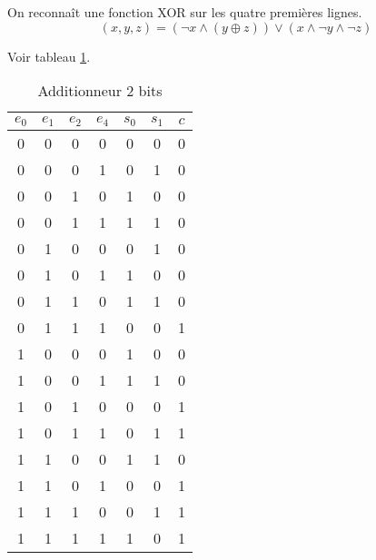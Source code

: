 \documentclass[a4paper,11pt]{article}
\begin{document}
\begin{Form}
\begin{exo}
On reconnaît une fonction XOR sur les quatre premières lignes.
$$(x,y,z)=(\lnot x \land (y \oplus z)) \lor (x \land \lnot y \land \lnot z)$$
\end{exo}
\begin{exo} Voir tableau \ref{addi}.
\begin{table}[!h]
\begin{center}
\begin{tabular}{|*4{c|}|*3{c|}}
\hline 
$e_0$ & $e_1$ & $e_2$ & $e_4$ & $s_0$ & $s_1$ & $c$ \\ 
\hline 
0 & 0 & 0 & 0 & 0 & 0 & 0 \\ 
\hline 
0 & 0 & 0 & 1 & 0 & 1 & 0 \\ 
\hline
0 & 0 & 1 & 0 & 1 & 0 & 0 \\ 
\hline
0 & 0 & 1 & 1 & 1 & 1 & 0 \\ 
\hline
0 & 1 & 0 & 0 & 0 & 1 & 0 \\ 
\hline
0 & 1 & 0 & 1 & 1 & 0 & 0 \\ 
\hline
0 & 1 & 1 & 0 & 1 & 1 & 0 \\ 
\hline
0 & 1 & 1 & 1 & 0 & 0 & 1 \\ 
\hline
1 & 0 & 0 & 0 & 1 & 0 & 0 \\ 
\hline
1 & 0 & 0 & 1 & 1 & 1 & 0 \\ 
\hline
1 & 0 & 1 & 0 & 0 & 0 & 1 \\ 
\hline
1 & 0 & 1 & 1 & 0 & 1 & 1 \\ 
\hline
1 & 1 & 0 & 0 & 1 & 1 & 0 \\ 
\hline
1 & 1 & 0 & 1 & 0 & 0 & 1 \\ 
\hline
1 & 1 & 1 & 0 & 0 & 1 & 1 \\ 
\hline
1 & 1 & 1 & 1 & 1 & 0 & 1 \\ 
\hline
\end{tabular}
\caption{\label{addi}Additionneur 2 bits}
\end{center}
\end{table} 
\end{exo}
\end{Form}
\end{document}
